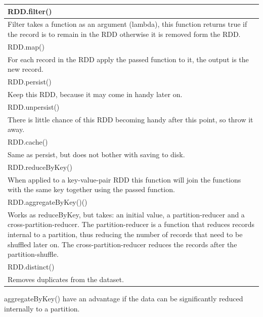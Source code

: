 \documentclass[abstract=on]{article}
\begin{document}
\begin{center}
\begin{tabularx}{0.75\textwidth}{ |X| }
\hline
\cellcolor[gray]{0.9}
RDD.filter() \\ \hline
Filter takes a function as an argument (lambda), this function returns true 
if the record is to remain in the RDD otherwise it is removed form the RDD. 
\\ \hline
\hline
\cellcolor[gray]{0.9}
RDD.map() \\ \hline
For each record in the RDD apply the passed function to it, the output is the 
 new record.
\\ \hline
\hline
\cellcolor[gray]{0.9}
RDD.persist() \\ \hline
Keep this RDD, because it may come in handy later on.
\\ \hline
\hline
\cellcolor[gray]{0.9}
RDD.unpersist() \\ \hline
There is little chance of this RDD becoming handy after this point, so throw it 
away.
\\ \hline
\hline
\cellcolor[gray]{0.9}
RDD.cache() \\ \hline
Same as persist, but does not bother with saving to disk.
\\ \hline
\hline
\cellcolor[gray]{0.9}
RDD.reduceByKey() \\ \hline
When applied to a key-value-pair RDD this function will join the functions with 
the same key together using the passed
function.
\\ \hline
\hline
\cellcolor[gray]{0.9}
RDD.aggregateByKey()() \\ \hline
Works as reduceByKey, but takes: an initial value, a partition-reducer and a 
cross-partition-reducer. The partition-reducer is a function that reduces 
records internal to a partition, thus reducing the number of records that need 
to be shuffled later on. The cross-partition-reducer reduces the records after 
the partition-shuffle.
\\ \hline

\hline
\cellcolor[gray]{0.9}
RDD.distinct() \\ \hline
Removes duplicates from the dataset.
\\ \hline
\end{tabularx}

\end{center}
aggregateByKey() have an advantage if the data can be significantly reduced internally to a partition.
\end{document}
